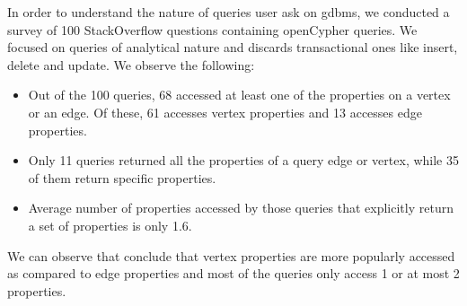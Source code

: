 \begin{guideline}
In order to understand the nature of queries user ask on \gls{gdbms}, we conducted a survey of 100 StackOverflow questions containing openCypher queries. We focused on queries of analytical nature and discards transactional ones like insert, delete and update. We observe the following: 

\begin{itemize}
	
	\item Out of the 100 queries, 68 accessed at least one of the properties on a vertex or an edge. Of these, 61 accesses vertex properties and 13 accesses edge properties.
	
	\item Only 11 queries returned all the properties of a query edge or vertex, while 35 of them return specific properties.
	
	\item Average number of properties accessed by those queries that explicitly return a set of properties is only 1.6.
	
\end{itemize}

We can observe that conclude that vertex properties are more popularly accessed as compared to edge properties and most of the queries only access 1 or at most 2 properties.

\end{guideline}
